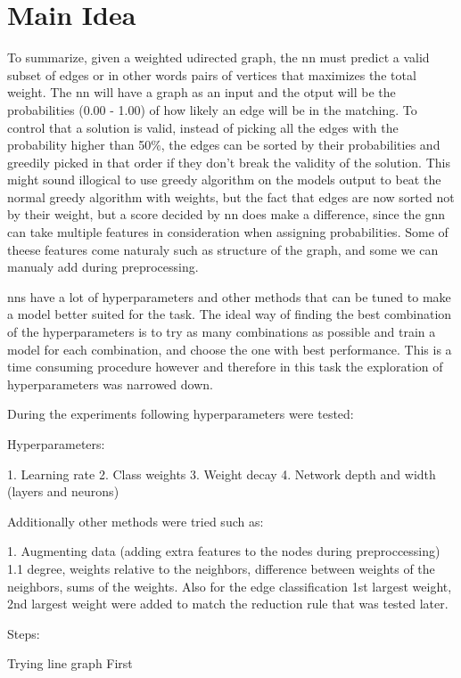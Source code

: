 \section{Main Idea}

To summarize, given a weighted udirected graph, the \gls{nn} must predict  a valid subset of edges or in other words pairs of vertices that maximizes the total weight. The \gls{nn} will have a graph as an input and the otput will be the probabilities (0.00 - 1.00) of how likely an edge will be in the matching. To control that a solution is valid, instead of picking all the edges with the probability higher than 50\%, the edges can be sorted by their probabilities and greedily picked in that order if they don't break the validity of the solution. This might sound illogical to use greedy algorithm on the models output to beat the normal greedy algorithm with weights, but the fact that edges are now sorted not by their weight, but a score decided by \gls{nn} does make a difference, since the \gls{gnn} can take multiple features in consideration when assigning probabilities. Some of theese features come naturaly such as structure of the graph, and some we can manualy add during preprocessing. 

\gls{nn}s have a lot of hyperparameters and other methods that can be tuned to make a model better suited for the task. The ideal way of finding the best combination of the hyperparameters is to try as many combinations as possible and train a model for each combination, and choose the one with best performance. This is a time consuming procedure however and therefore in this task the exploration of hyperparameters was narrowed down. 

During the experiments following hyperparameters were tested:

Hyperparameters:

1. Learning rate
2. Class weights
3. Weight decay
4. Network depth and width (layers and neurons)

Additionally other methods were tried such as:

1. Augmenting data (adding extra features to the nodes during preproccessing)
	1.1 degree, weights relative to the neighbors, difference between weights of the neighbors, sums of the weights. Also for the edge classification 1st largest weight, 2nd largest weight were added to match the reduction rule that was tested later.

Steps:

Trying line graph First

